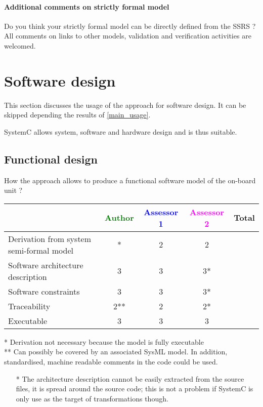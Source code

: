\begin{assesor1}
\paragraph{Additional comments on strictly formal model} Do you think your strictly formal model can be directly defined from the SSRS ?
All comments on links to other models, validation and verification activities are welcomed.


\section{Software design}
This section discusses the usage of the approach for software design.
It can be skipped depending the results of \ref{main_usage}.

\begin{author_comment}
SystemC allows system, software and hardware design and is thus suitable.
\end{author_comment}

\subsection{Functional design}

How the approach allows to produce a functional software model of the on-board unit ?

\begin{tabular}{|l | c | c | c | c|}
\hline
& \textcolor{green}{Author} & \textcolor{blue}{Assessor 1} & \textcolor{magenta}{Assessor 2} & Total \\
\hline
Derivation from system semi-formal model &* &2 &2 & \\
\hline
Software architecture description &3 &3 &3* & \\
\hline
Software constraints &3 &3 &3* & \\
\hline
Traceability &2** &2 &2* & \\
\hline
Executable &3 &3 &3 & \\
\hline
\end{tabular}

\begin{author_comment}
* Derivation not necessary because the model is fully executable\\
** Can possibly be covered by an associated SysML model. In addition, standardised, machine readable comments in the code could be used.\\
\end{author_comment}

\begin{assessor2}
  \begin{itemize}
  \item[*] The architecture description cannot be easily extracted
    from the source files, it is spread around the source code; this
    is not a problem if SystemC is only use as the target of
    transformations though.
  \end{itemize}  
\end{assessor2}



\end{assesor1}
